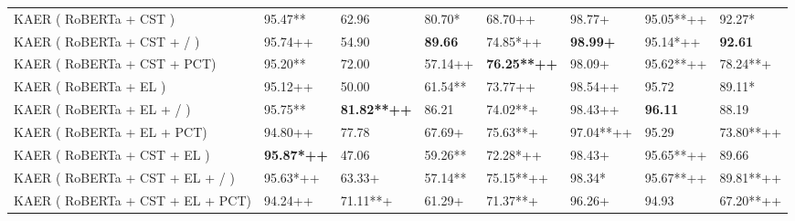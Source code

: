 \begin{table*}[!ht]
{\begin{tabular}{l|ll|llll|l}
KAER ( RoBERTa + CST )           & 95.47**                           & 62.96                       & 80.70*                      & 68.70++                   & 98.77+                 & 95.05**++                       & 92.27*                               \\
KAER ( RoBERTa + CST + / )       & 95.74++                         & 54.90                       & \textbf{89.66}              & 74.85*++                  & \textbf{98.99+}        & 95.14*++                        & \textbf{92.61}                       \\
KAER ( RoBERTa + CST + PCT)      & 95.20**                           & 72.00                       & 57.14++                   & \textbf{76.25**++}        & 98.09+                 & 95.62**++                       & 78.24**+                            \\
KAER ( RoBERTa + EL )            & 95.12++                         & 50.00                       & 61.54**                     & 73.77++                   & 98.54++               & 95.72                             & 89.11*                               \\
KAER ( RoBERTa + EL + / )        & 95.75**                           & \textbf{81.82**++}        & 86.21                       & 74.02**+                   & 98.43++               & \textbf{96.11}                    & 88.19                                \\
KAER ( RoBERTa + EL + PCT)       & 94.80++                         & 77.78                       & 67.69+                     & 75.63**+                   & 97.04**++             & 95.29                             & 73.80**++                          \\
KAER ( RoBERTa + CST + EL )      & \textbf{95.87*++}               & 47.06                       & 59.26**                     & 72.28*++                  & 98.43+                 & 95.65**++                       & 89.66                                \\
KAER ( RoBERTa + CST + EL + / )  & 95.63*++                        & 63.33+                     & 57.14**                     & 75.15**++                 & 98.34*                  & 95.67**++                       & 89.81**++                          \\
KAER ( RoBERTa + CST + EL + PCT) & 94.24++                         & 71.11**+                   & 61.29+                     & 71.37**+                   & 96.26+                 & 94.93                             & 67.20**++                          \\ \hline

\end{tabular}}
\end{table*}
